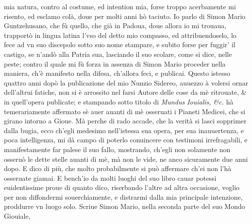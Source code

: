 \documentclass[11pt,twoside,openany]{book}
\begin{document}
mia natura, contro al costume, ed intention mia, forse troppo acerbamente mi risento, ed esclamo colà, doue per molti anni hò taciuto. Io parlo di Simon Mario Guntzehusano, che fù quello, che già in Padoua, doue allora io mi trouaua, trapportò in lingua latina l'vso del detto mio compasso, ed attribuendoselo, lo fece ad vn suo discepolo sotto suo nome stampare, e subito forse per fuggir' il castigo, se n'andò alla Patria sua, lasciando il suo scolare, come si dice, nelle peste; contro il quale mi fù forza in assenza di Simon Mario proceder nella maniera, ch'è manifesto nella difesa, ch'allora feci, e publicai. Questo istesso quattro anni dopò la publicazione del mio Nunzio Sidereo, auuezzo à volersi ornar dell'altrui fatiche, non si è arrossito nel farsi Autore delle cose da mè ritrouate, \& in quell'opera publicate; e stampando sotto titolo di \textit{Mundus Iouialis, \&c.} hà temerariamente affermato sè auer auanti di mè osseruati i Pianeti Medicei, che si girano intorno a Gioue. Mà perche di rado accade, che la verità si lasci sopprimer dalla bugia, ecco ch'egli medesimo nell'istessa sua opera, per sua inauuertenza, e poca intelligenza, mi dà campo di poterlo conuincere con testimoni irrefragabili, e manifestamente far palese il suo fallo, mostrando, ch'egli non solamente non osseruò le dette stelle auanti di mè, mà non le vide, ne anco sicuramente due anni dopo. E dico di più, che molto probabilmente si può affermare ch'ei non l'hà osseruate giamai. E bench'io da molti luoghi del suo libro cauar potessi euidentissime proue di quanto dico, riserbando l'altre ad altra occasione, voglio per non diffondermi souerchiamente, e distrarmi dalla mia principale intenzione, proddurre vn luogo solo. Scriue Simon Mario, nella seconda parte del suo Mondo Giouiale,
\end{document}
